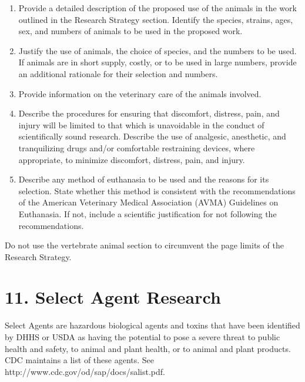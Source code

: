 \documentclass[11pt, notitlepage]{article} %
\begin{document}
\begin{enumerate}
	\item Provide a detailed description of the proposed use of the animals in the work outlined in the Research Strategy section. Identify the species, strains, ages, sex, and numbers of animals to be used in the proposed work.
	\item Justify the use of animals, the choice of species, and the numbers to be used. If animals are in short supply, costly, or to be used in large numbers, provide an additional rationale for their selection and numbers.
	\item Provide information on the veterinary care of the animals involved.
	\item Describe the procedures for ensuring that discomfort, distress, pain, and injury will be limited to that which is unavoidable in the conduct of scientifically sound research. Describe the use of analgesic, anesthetic, and tranquilizing drugs and/or comfortable restraining devices, where appropriate, to minimize discomfort, distress, pain, and injury.
	\item Describe any method of euthanasia to be used and the reasons for its selection. State whether this method is consistent with the recommendations of the American Veterinary Medical Association (AVMA) Guidelines on Euthanasia. If not, include a scientific justification for not following the recommendations.
\end{enumerate}

Do not use the vertebrate animal section to circumvent the page limits of the Research Strategy.


\newpage

\section*{11. Select Agent Research}

Select Agents are hazardous biological agents and toxins that have been identified by DHHS or USDA as having the potential to pose a severe threat to public health and safety, to animal and plant health, or to animal and plant products. CDC maintains a list of these agents. See http://www.cdc.gov/od/sap/docs/salist.pdf.

\end{document}
